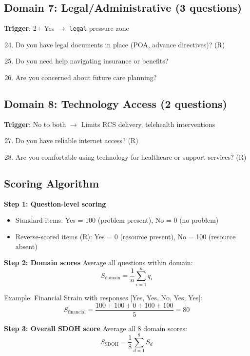 \documentclass{article}%
\begin{document}
\subsection*{Domain 7: Legal/Administrative (3 questions)}
\textbf{Trigger}: 2+ Yes $\rightarrow$ \texttt{legal} pressure zone

\begin{enumerate}
    \setcounter{enumi}{23}
    \item Do you have legal documents in place (POA, advance directives)? (R)
    \item Do you need help navigating insurance or benefits?
    \item Are you concerned about future care planning?
\end{enumerate}

\subsection*{Domain 8: Technology Access (2 questions)}
\textbf{Trigger}: No to both $\rightarrow$ Limits RCS delivery, telehealth interventions

\begin{enumerate}
    \setcounter{enumi}{26}
    \item Do you have reliable internet access? (R)
    \item Are you comfortable using technology for healthcare or support services? (R)
\end{enumerate}

\subsection*{Scoring Algorithm}

\textbf{Step 1: Question-level scoring}
\begin{itemize}
    \item Standard items: Yes = 100 (problem present), No = 0 (no problem)
    \item Reverse-scored items (R): Yes = 0 (resource present), No = 100 (resource absent)
\end{itemize}

\textbf{Step 2: Domain scores}  
Average all questions within domain:
$$S_{\text{domain}} = \frac{1}{n} \sum_{i=1}^{n} q_i$$

Example: Financial Strain with responses [Yes, Yes, No, Yes, Yes]:
$$S_{\text{financial}} = \frac{100 + 100 + 0 + 100 + 100}{5} = 80$$

\textbf{Step 3: Overall SDOH score}  
Average all 8 domain scores:
$$S_{\text{SDOH}} = \frac{1}{8} \sum_{d=1}^{8} S_{d}$$
\end{document}
